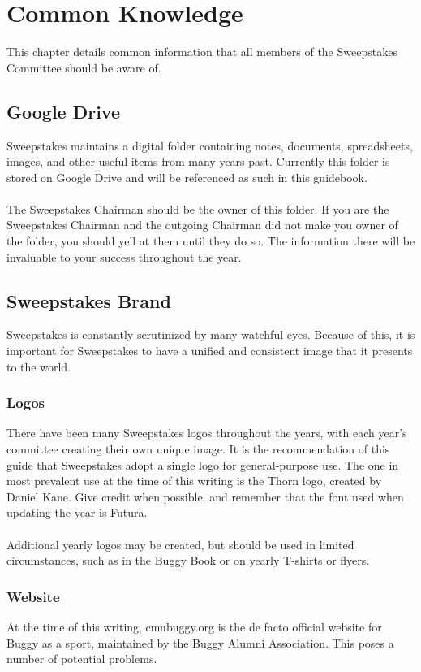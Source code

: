 \chapter{Common Knowledge}
\label{ch:Common}

This chapter details common information that all members of the Sweepstakes
Committee should be aware of.

\section{Google Drive}
\label{sec:GDrive}
Sweepstakes maintains a digital folder containing notes, documents,
spreadsheets, images, and other useful items from many years past. Currently
this folder is stored on Google Drive and will be referenced as such in this
guidebook.
\\\\
The Sweepstakes Chairman should be the owner of this folder. If you are
the Sweepstakes Chairman and the outgoing Chairman did not make you owner
of the folder, you should yell at them until they do so. The information
there will be invaluable to your success throughout the year.

\section{Sweepstakes Brand}
\label{sec:Brand}
Sweepstakes is constantly scrutinized by many watchful eyes. Because of this,
it is important for Sweepstakes to have a unified and consistent image that
it presents to the world.

\subsection{Logos}
\label{subsec:Logos}
There have been many Sweepstakes logos throughout the years, with each year's
committee creating their own unique image. It is the recommendation of this
guide that Sweepstakes adopt a single logo for general-purpose use. The one in
most prevalent use at the time of this writing is the Thorn logo, created by
Daniel Kane. Give credit when possible, and remember that the font used when
updating the year is Futura.
\\\\
Additional yearly logos may be created, but should be used in limited
circumstances, such as in the Buggy Book or on yearly T-shirts or flyers.

\subsection{Website}
\label{subsec:Website}
At the time of this writing, cmubuggy.org is the de facto official website for
Buggy as a sport, maintained by the Buggy Alumni Association. This poses a
number of potential problems.

